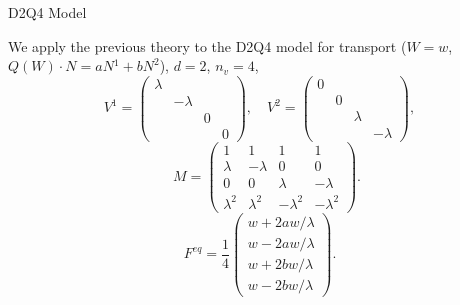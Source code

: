 \documentclass[english]{beamer}
\begin{document}
\begin{frame}{D2Q4 Model \cite{guillon2023stability,aregba2000discrete}}

We apply the previous theory to the D2Q4 model for transport
($W=w$, $Q(W)\cdot N=aN{{}^1}+bN^{2}$), $d=2$, $n_{v}=4$,
\[
V^{1}=\left(\begin{array}{cccc}
\lambda\\
 & -\lambda\\
 &  & 0\\
 &  &  & 0
\end{array}\right),\quad V^{2}=\left(\begin{array}{cccc}
0\\
 & 0\\
 &  & \lambda\\
 &  &  & -\lambda
\end{array}\right),
\]
\[
  \quad M=\left(\begin{array}{cccc}
    1 & 1 & 1 & 1\\
    \lambda & -\lambda & 0 & 0\\
    0 & 0 & \lambda & -\lambda\\
    \lambda^{2} & \lambda^{2} & -\lambda^{2} & -\lambda^{2}
    \end{array}\right).\]
\[
F^{eq}=\frac{1}{4}\left(\begin{array}{c}
w+2aw/\lambda\\
w-2aw/\lambda\\
w+2bw/\lambda\\
w-2bw/\lambda
\end{array}\right).
\]

\end{frame}
\end{document}
